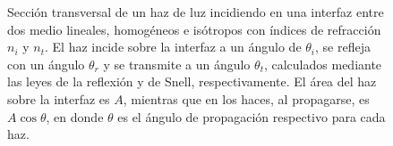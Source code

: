 \begin{figure}[t]
	\caption{Sección transversal de un haz de luz incidiendo en una interfaz entre dos medio lineales, homogéneos e isótropos con índices de refracción $n_i$ y $n_t$. El haz incide sobre la interfaz a un ángulo de $\theta_i$, se refleja con un ángulo $\theta_r$ y se transmite a un ángulo $\theta_t$, calculados mediante las leyes de la reflexión y de Snell, respectivamente. El área del haz sobre la interfaz es $A$, mientras que en los haces, al propagarse, es $A\cos\theta$, en donde $\theta$ es el ángulo de propagación respectivo para cada haz.} \label{fig:hazcircular}
	\end{figure}

